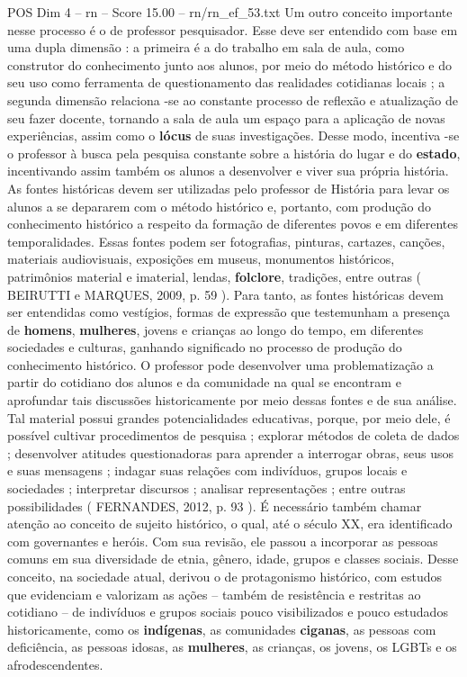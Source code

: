\begin{textsample}{POS Dim 4 – rn – Score 15.00 – rn/rn\_ef\_53.txt}
Um outro conceito importante nesse processo é o de professor pesquisador.
Esse deve ser entendido com base em uma dupla dimensão : a primeira é a do trabalho em sala de aula, como construtor do conhecimento junto aos alunos, por meio do método histórico e do seu uso como ferramenta de questionamento das realidades cotidianas locais ; a segunda dimensão relaciona -se ao constante processo de reflexão e atualização de seu fazer docente, tornando a sala de aula um espaço para a aplicação de novas experiências, assim como o \textbf{lócus} de suas investigações.
Desse modo, incentiva -se o professor à busca pela pesquisa constante sobre a história do lugar e do \textbf{estado}, incentivando assim também os alunos a desenvolver e viver sua própria história.
As fontes históricas devem ser utilizadas pelo professor de História para levar os alunos a se depararem com o método histórico e, portanto, com produção do conhecimento histórico a respeito da formação de diferentes povos e em diferentes temporalidades.
Essas fontes podem ser fotografias, pinturas, cartazes, canções, materiais audiovisuais, exposições em museus, monumentos históricos, patrimônios material e imaterial, lendas, \textbf{folclore}, tradições, entre outras ( BEIRUTTI e MARQUES, 2009, p. 59 ).
Para tanto, as fontes históricas devem ser entendidas como vestígios, formas de expressão que testemunham a presença de \textbf{homens}, \textbf{mulheres}, jovens e crianças ao longo do tempo, em diferentes sociedades e culturas, ganhando significado no processo de produção do conhecimento histórico.
O professor pode desenvolver uma problematização a partir do cotidiano dos alunos e da comunidade na qual se encontram e aprofundar tais discussões historicamente por meio dessas fontes e de sua análise.
Tal material possui grandes potencialidades educativas, porque, por meio dele, é possível cultivar procedimentos de pesquisa ; explorar métodos de coleta de dados ; desenvolver atitudes questionadoras para aprender a interrogar obras, seus usos e suas mensagens ; indagar suas relações com indivíduos, grupos locais e sociedades ; interpretar discursos ; analisar representações ; entre outras possibilidades ( FERNANDES, 2012, p. 93 ).
É necessário também chamar atenção ao conceito de sujeito histórico, o qual, até o século XX, era identificado com governantes e heróis.
Com sua revisão, ele passou a incorporar as pessoas comuns em sua diversidade de etnia, gênero, idade, grupos e classes sociais.
Desse conceito, na sociedade atual, derivou o de protagonismo histórico, com estudos que evidenciam e valorizam as ações – também de resistência e restritas ao cotidiano – de indivíduos e grupos sociais pouco visibilizados e pouco estudados historicamente, como os \textbf{indígenas}, as comunidades \textbf{ciganas}, as pessoas com deficiência, as pessoas idosas, as \textbf{mulheres}, as crianças, os jovens, os LGBTs e os afrodescendentes.

\end{textsample}
